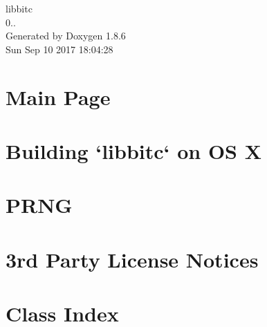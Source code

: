 \documentclass[twoside]{book}
\newcommand{\clearemptydoublepage}{%
  \newpage{\pagestyle{empty}\cleardoublepage}%
}
\begin{document}
\hypersetup{pageanchor=false}
\begin{titlepage}
\vspace*{7cm}
\begin{center}%
{\Large libbitc \\[1ex]\large 0.. }\\
\vspace*{1cm}
{\large Generated by Doxygen 1.8.6}\\
\vspace*{0.5cm}
{\small Sun Sep 10 2017 18:04:28}\\
\end{center}
\end{titlepage}
\clearemptydoublepage
\tableofcontents
\clearemptydoublepage
{}
\hypersetup{pageanchor=true}

\chapter{Main Page}
\label{index}\hypertarget{index}{}
\chapter{Building `libbitc` on O\-S X}
\label{md__home_ubuntu_workspace_doc_build-osx}
\hypertarget{md__home_ubuntu_workspace_doc_build-osx}{}

\chapter{P\-R\-N\-G}
\label{md__home_ubuntu_workspace_doc_PRNG}
\hypertarget{md__home_ubuntu_workspace_doc_PRNG}{}

\chapter{3rd Party License Notices}
\label{md__home_ubuntu_workspace_LICENSE-3RD-PARTY}
\hypertarget{md__home_ubuntu_workspace_LICENSE-3RD-PARTY}{}

\chapter{Class Index}

\end{document}
